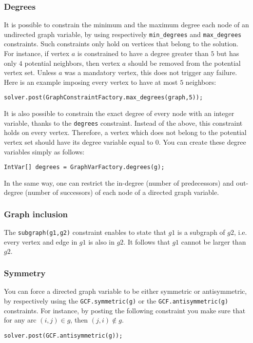 \documentclass{article}
\begin{document}
\subsubsection{Degrees}

It is possible to constrain the minimum and the maximum degree each node of an undirected graph variable, by using respectively \texttt{min\_degrees} and \texttt{max\_degrees} constraints. 
Such constraints only hold on vertices that belong to the solution. For instance, if vertex $a$ is constrained to have a degree greater than $5$ but has only $4$ potential neighbors, then vertex $a$ should be removed from the potential vertex set. Unless $a$ was a mandatory vertex, this does not trigger any failure. Here is an example imposing every vertex to have at most $5$ neighbors: 
\begin{lstlisting}
solver.post(GraphConstraintFactory.max_degrees(graph,5));
\end{lstlisting}

It is also possible to constrain the exact degree of every node with an integer variable, thanks to the \texttt{degrees} constraint. Instead of the above, this constraint holds on every vertex. Therefore, a vertex which does not belong to the potential vertex set should have its degree variable equal to $0$. You can create these degree variables simply as follows:
\begin{lstlisting}
IntVar[] degrees = GraphVarFactory.degrees(g);
\end{lstlisting}

In the same way, one can restrict the in-degree (number of predecessors) and out-degree (number of successors) of each node of a directed graph variable.  
 
\subsubsection{Graph inclusion}

The \texttt{subgraph(g1,g2)} constraint enables to state that $g1$ is a subgraph of $g2$, i.e. every vertex and edge in $g1$ is also in $g2$. It follows that $g1$ cannot be larger than $g2$. 

\subsubsection{Symmetry}

You can force a directed graph variable to be either symmetric or antisymmetric, by respectively using the \texttt{GCF.symmetric(g)} or the \texttt{GCF.antisymmetric(g)} constraints. For instance, by posting the following constraint you make sure that for any arc $(i,j)\in g$, then $(j,i) \notin g$.
\begin{lstlisting}
solver.post(GCF.antisymmetric(g));
\end{lstlisting}  
\end{document}
